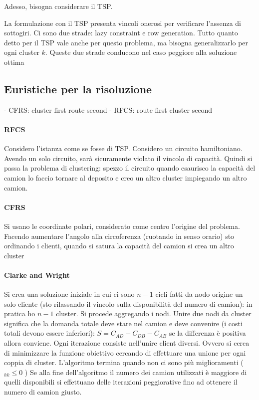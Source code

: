 \documentclass{article}
\begin{document}
Adesso, bisogna considerare il TSP.

La formulazione con il TSP presenta vincoli onerosi per verificare l'assenza 
di sottogiri.
Ci sono due strade: lazy constraint e row generation. Tutto quanto detto per il 
TSP vale anche per questo problema, ma bisogna generalizzarlo per ogni cluster 
$k$. Queste due strade conducono nel caso peggiore alla soluzione ottima

\subsection{Euristiche per la risoluzione}
- CFRS: cluster first route second 
- RFCS: route first cluster second

\paragraph{RFCS}
Considero l'istanza come se fosse di TSP. Considero un circuito hamiltoniano.
Avendo un solo circuito, sarà sicuramente violato il vincolo di capacità. Quindi 
si passa la problema di clustering: spezzo il circuito quando esaurisco la 
capacità del camion lo faccio tornare al deposito e creo un altro cluster 
impiegando un altro camion.

\paragraph{CFRS}
Si usano le coordinate polari, considerato come centro l'origine del problema. 
Facendo aumentare l'angolo alla circoferenza (ruotando in senso orario)
sto ordinando i clienti, quando si satura la capacità del camion si crea un 
altro cluster

\paragraph{Clarke and Wright}
Si crea una soluzione iniziale in cui ci sono $n-1$ cicli fatti da nodo origine 
un solo cliente (sto rilassando il vincolo sulla disponibilità del numero di 
camion): in pratica ho $n-1$ cluster. Si procede aggregando i nodi. 
Unire due nodi da cluster significa che la domanda totale deve stare nel camion e deve 
convenire (i costi totali devono essere inferiori): $S = C_{AD} + C_{DB} - C_{AB}$
se la differenza è positiva allora conviene. 
Ogni iterazione consiste nell'unire client diversi. Ovvero si cerca di minimizzare 
la funzione obiettivo cercando di effettuare una unione per ogni coppia di cluster.
L'algoritmo termina quando non ci sono più miglioramenti ($_{hk} \leq 0$ )
Se alla fine dell'algoritmo il numero dei camion utilizzati è maggiore di quelli 
disponibili si effettuano delle iterazioni peggiorative fino ad ottenere il numero 
di camion giusto.
\end{document}
